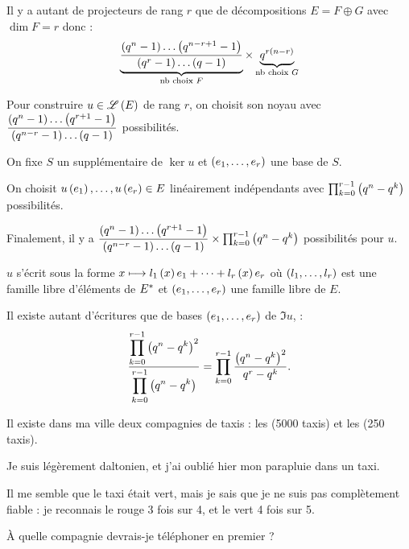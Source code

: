\begin{corr}[4]
Il y a autant de projecteurs de rang \(r\) que de décompositions \(E=F\oplus G\) avec \(\dim F=r\) donc : \[\underbrace{\dfrac{\left(q^n-1\right)\dots\left(q^{n-r+1}-1\right)}{\left(q^r-1\right)\dots\left(q-1\right)}}_{\text{nb choix }F}\times \underbrace{q^{r\left(n-r\right)}}_{\text{nb choix }G}\]
\end{corr}

\begin{corr}[5, méthode 1]
Pour construire \(u\in\mathscr{L}\left(E\right)\) de rang \(r\), on choisit son noyau avec \(\dfrac{\left(q^n-1\right)\dots\left(q^{r+1}-1\right)}{\left(q^{n-r}-1\right)\dots\left(q-1\right)}\) possibilités.

On fixe \(S\) un supplémentaire de \(\ker u\) et \(\left(e_1,\dots,e_r\right)\) une base de \(S\).

On choisit \(u\left(e_1\right),\dots,u\left(e_r\right)\in E\) linéairement indépendants avec \(\prod_{k=0}^{r-1}\left(q^n-q^k\right)\) possibilités.

Finalement, il y a \(\dfrac{\left(q^n-1\right)\dots\left(q^{r+1}-1\right)}{\left(q^{n-r}-1\right)\dots\left(q-1\right)}\times\prod_{k=0}^{r-1}\left(q^n-q^k\right)\) possibilités pour \(u\).
\end{corr}

\begin{corr}[5, méthode 2]
\(u\) s'écrit sous la forme \(x\longmapsto l_1\left(x\right)e_1+\dots+l_r\left(x\right)e_r\) où \(\left(l_1,\dots,l_r\right)\) est une famille libre d'éléments de \(E^{*}\) et \(\left(e_1,\dots,e_r\right)\) une famille libre de \(E\).

Il existe autant d'écritures que de bases \(\left(e_1,\dots,e_r\right)\) de \(\Im u\), \cad : \[\dfrac{\displaystyle\prod_{k=0}^{r-1}\left(q^n-q^k\right)^2}{\displaystyle\prod_{k=0}^{r-1}\left(q^n-q^k\right)}=\prod_{k=0}^{r-1}\dfrac{\left(q^n-q^k\right)^2}{q^r-q^k}.\]
\end{corr}

\begin{exo}[Exercice 4]
Il existe dans ma ville deux compagnies de taxis : les  (5000 taxis) et les  (250 taxis).

Je suis légèrement daltonien, et j'ai oublié hier mon parapluie dans un taxi.

Il me semble que le taxi était vert, mais je sais que je ne suis pas complètement fiable : je reconnais le rouge 3 fois sur 4, et le vert 4 fois sur 5.

À quelle compagnie devrais-je téléphoner en premier ?
\end{exo}

